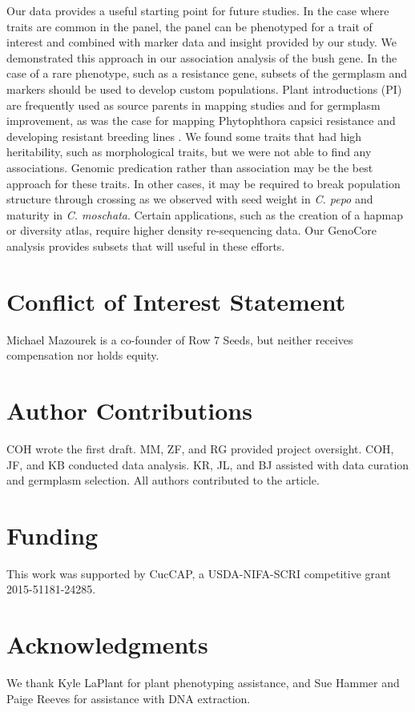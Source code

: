 \documentclass[utf8]{FrontiersinHarvard} %
\begin{document}
Our data provides a useful starting point for future studies. In the case where traits are common in the panel, the panel can be phenotyped for a trait of interest and combined with marker data and insight provided by our study. We demonstrated this approach in our association analysis of the bush gene. In the case of a rare phenotype, such as a resistance gene, subsets of the germplasm and markers should be used to develop custom populations. Plant introductions (PI) are frequently used as source parents in mapping studies and for germplasm improvement, as was the case for mapping Phytophthora capsici resistance and developing resistant breeding lines \citep{Vogel2021,LaPlant2020}. We found some traits that had high heritability, such as morphological traits, but we were not able to find any associations. Genomic predication rather than association may be the best approach for these traits. In other cases, it may be required to break population structure through crossing as we observed with seed weight in \textit{C. pepo} and maturity in \textit{C. moschata}. Certain applications, such as the creation of a hapmap or diversity atlas, require higher density re-sequencing data. Our GenoCore analysis provides subsets that will useful in these efforts.

\section*{Conflict of Interest Statement}
Michael Mazourek is a co-founder of Row 7 Seeds, but neither receives compensation nor holds equity.

\section*{Author Contributions}

COH wrote the first draft. MM, ZF, and RG provided project oversight. COH, JF, and KB conducted data analysis. KR, JL, and BJ assisted with data curation and germplasm selection. All authors contributed to the article.

\section*{Funding}

This work was supported by CucCAP, a USDA-NIFA-SCRI competitive grant 2015-51181-24285.

\section*{Acknowledgments}
We thank Kyle LaPlant for plant phenotyping assistance, and Sue Hammer and Paige Reeves for assistance with DNA extraction.
\end{document}
